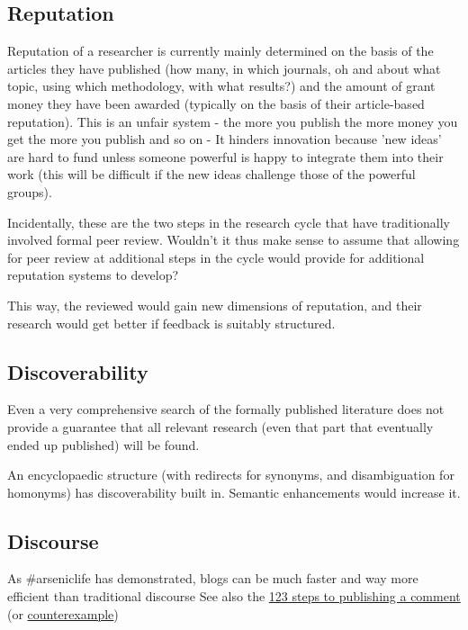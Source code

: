 \documentclass[final,authoryear,3p]{elsarticle-open-drafting}
\begin{document}
\subsection{Reputation}
Reputation of a researcher is currently mainly determined on the basis of the articles they have published (how many, in which 
journals, oh and about what topic, using which methodology, with what results?) and the amount of grant money they have been
awarded (typically on the basis of their article-based reputation). This is an unfair system - the more you publish the more money you get the more you publish and so on - It hinders innovation because 'new ideas' are hard to fund unless someone powerful is happy to integrate them into their work (this will be difficult if the new ideas challenge those of the powerful groups). 

Incidentally, these are the two steps in the research cycle that have traditionally involved formal peer review. Wouldn't it thus make sense to assume that allowing for peer review at additional steps in the cycle would provide for additional reputation systems to develop?

This way, the reviewed would gain new dimensions of reputation, and their research would get better if feedback is suitably structured.

\subsection{Discoverability}
Even a very comprehensive search of the formally published literature does not provide a guarantee that all relevant research (even that part that eventually ended up published) will be found. 

An encyclopaedic structure (with redirects for synonyms, and disambiguation for homonyms) has discoverability built in. Semantic enhancements would increase it.

\subsection{Discourse}
As \#arseniclife has demonstrated, blogs can be much faster and way more efficient than traditional discourse
See also the \href{http://scienceblogs.com/catdynamics/2009/08/how_to_publish_a_scientific_co.php}{123 steps to publishing a comment} (or \href{http://slawekk.wordpress.com/2010/05/21/how-to-publish-counterexamples-in-1-2-3-easy-steps/}{counterexample})
\end{document}
